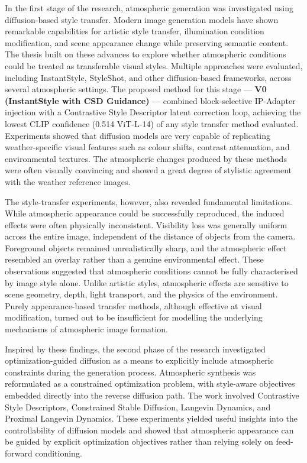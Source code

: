 \noindent In the first stage of the research, atmospheric generation was investigated using diffusion-based style transfer. Modern image generation models have shown remarkable capabilities for artistic style transfer, illumination condition modification, and scene appearance change while preserving semantic content. The thesis built on these advances to explore whether atmospheric conditions could be treated as transferable visual styles. Multiple approaches were evaluated, including InstantStyle, StyleShot, and other diffusion-based frameworks, across several atmospheric settings. The proposed method for this stage --- \textbf{V0 (InstantStyle with CSD Guidance)} --- combined block-selective IP-Adapter injection with a Contrastive Style Descriptor latent correction loop, achieving the lowest CLIP confidence (0.514 ViT-L-14) of any style transfer method evaluated. Experiments showed that diffusion models are very capable of replicating weather-specific visual features such as colour shifts, contrast attenuation, and environmental textures. The atmospheric changes produced by these methods were often visually convincing and showed a great degree of stylistic agreement with the weather reference images.

\noindent The style-transfer experiments, however, also revealed fundamental limitations. While atmospheric appearance could be successfully reproduced, the induced effects were often physically inconsistent. Visibility loss was generally uniform across the entire image, independent of the distance of objects from the camera. Foreground objects remained unrealistically sharp, and the atmospheric effect resembled an overlay rather than a genuine environmental effect. These observations suggested that atmospheric conditions cannot be fully characterised by image style alone. Unlike artistic styles, atmospheric effects are sensitive to scene geometry, depth, light transport, and the physics of the environment. Purely appearance-based transfer methods, although effective at visual modification, turned out to be insufficient for modelling the underlying mechanisms of atmospheric image formation.

\noindent Inspired by these findings, the second phase of the research investigated optimization-guided diffusion as a means to explicitly include atmospheric constraints during the generation process. Atmospheric synthesis was reformulated as a constrained optimization problem, with style-aware objectives embedded directly into the reverse diffusion path. The work involved Contrastive Style Descriptors, Constrained Stable Diffusion, Langevin Dynamics, and Proximal Langevin Dynamics. These experiments yielded useful insights into the controllability of diffusion models and showed that atmospheric appearance can be guided by explicit optimization objectives rather than relying solely on feed-forward conditioning.

